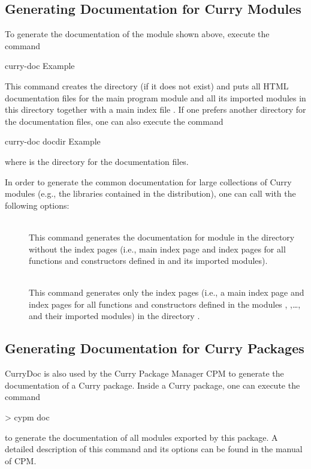 \subsection{Generating Documentation for Curry Modules}

To generate the documentation of the module  shown above,
execute the command
\begin{curry}
curry-doc Example
\end{curry}
This command creates the directory  (if it does not exist)
and puts all HTML documentation files for the main program module
and all its imported modules in this directory together with
a main index file .
If one prefers another directory for the documentation files,
one can also execute the command
\begin{curry}
curry-doc docdir Example
\end{curry}
where  is the directory for the documentation files.

In order to generate the common documentation for large collections
of Curry modules (e.g., the libraries contained in the \CYS distribution),
one can call  with the following options:
\begin{description}
\item[] ~\\
This command generates the documentation for module 
in the directory  without the index pages (i.e., main index page
and index pages for all functions and constructors defined in 
and its imported modules).
\item[] ~\\
This command generates only the index pages (i.e., a main index page
and index pages for all functions and constructors defined in the modules
, ,\ldots, and their imported modules)
in the directory .
\end{description}

\subsection{Generating Documentation for Curry Packages}

CurryDoc is also used by the Curry Package Manager CPM
to generate the documentation of a Curry package.
Inside a Curry package, one can execute the command
%
\begin{curry}
> cypm doc
\end{curry}
%
to generate the documentation of all modules exported by this package.
A detailed description of this command and its options
can be found in the manual of CPM.


